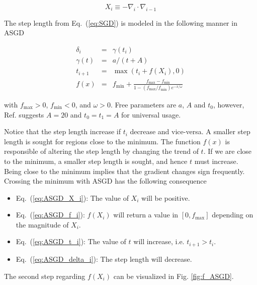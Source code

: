 \begin{equation}
\label{eq:ASGD_X_i}
 X_i \equiv -\nabla_i\cdot \nabla_{i-1}
\end{equation}

The step length from Eq.~(\ref{eq:SGD}) is modeled in the following manner in ASGD

\begin{eqnarray}
 \delta_i   &=& \gamma(t_i) \\
 \gamma(t)  &=& a/(t + A) \label{eq:ASGD_delta_i}\\
 t_{i+1}    &=& \max(t_i + f(X_i), 0) \label{eq:ASGD_t_i}\\
 f(x)       &=& f_\mathrm{min} + \frac{f_\mathrm{max} - f_\mathrm{min}}{1 - (f_\mathrm{max}/f_\mathrm{min})e^{-x/\omega}}\label{eq:ASGD_f_i}
\end{eqnarray}

with $f_\mathrm{max} > 0$, $f_\mathrm{min} < 0$, and $\omega > 0$. Free parameters are $a$, $A$ and $t_0$, however, Ref. \cite{ASGD} suggests $A=20$ and $t_0=t_1=A$ for universal usage.

Notice that the step length increase if $t_i$ decrease and vice-versa. A smaller step length is sought for regions close to the minimum. The function $f(x)$ is responsible of altering the step length by changing the trend of $t$. If we are close to the minimum, a smaller step length is sought, and hence $t$ must increase. Being close to the minimum implies that the gradient changes sign frequently. Crossing the minimum with ASGD has the following consequence

\begin{itemize}
 \item Eq.~(\ref{eq:ASGD_X_i}): The value of $X_i$ will be positive.
 \item Eq.~(\ref{eq:ASGD_f_i}): $f(X_i)$ will return a value in $[0, f_\mathrm{max}]$ depending on the magnitude of $X_i$.
 \item Eq.~(\ref{eq:ASGD_t_i}): The value of $t$ will increase, i.e. $t_{i+1} > t_i$.
 \item Eq.~(\ref{eq:ASGD_delta_i}): The step length will decrease.
\end{itemize}

The second step regarding $f(X_i)$ can be visualized in Fig. \ref{fig:f_ASGD}.

